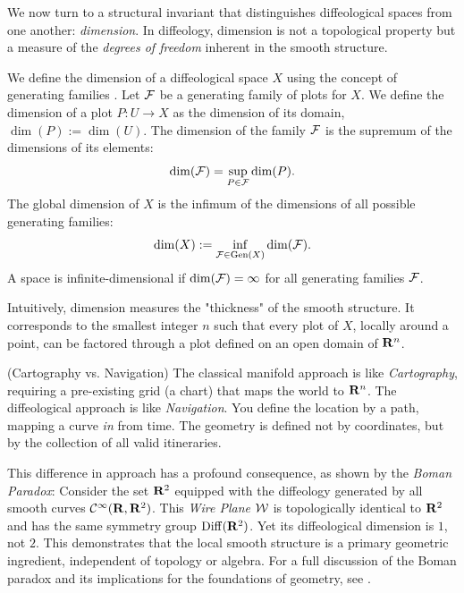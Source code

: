 \documentclass[10pt,reqno,letterpaper,twoside]{amsbook}
\begin{document}
  \begin{article}
    \label{subsec:The Diffeological Dimension}
    
    We now turn to a structural invariant that distinguishes diffeological spaces from one another: \emph{dimension}.
    In diffeology,
    dimension is not a topological property but a measure of the \emph{degrees of freedom} inherent in the smooth structure.
    
    We define the dimension of a diffeological space $X$ using the concept of generating families \cite{PIZ06}.
    Let $\mathcal{F}$ be a generating family of plots for $X$.
    We define the dimension of a plot $P: U \to X$ as the dimension of its domain,
    $\dim(P) := \dim(U)$.
    The dimension of the family $\mathcal{F}$ is the supremum of the dimensions of its elements:
    \[
      \dim(\mathcal{F}) = \sup_{P \in \mathcal{F}} \dim(P).
      \]
    The global dimension of $X$ is the infimum of the dimensions of all possible generating families:
    \[
      \dim(X) := \inf_{\mathcal{F} \in \mathrm{Gen}(X)} \dim(\mathcal{F}).
      \]
    A space is infinite-dimensional if $\dim(\mathcal{F}) = \infty$ for all generating families $\mathcal{F}$.
    
    Intuitively,
    dimension measures the "thickness" of the smooth structure.
    It corresponds to the smallest integer $n$ such that every plot of $X$,
    locally around a point,
    can be factored through a plot defined on an open domain of ${\mathbf{R}}^n$.
    
    \begin{remark} \textup{(Cartography vs. Navigation)}
      \label{subsec:Cartography vs. Navigation}
      The classical manifold approach is like \emph{Cartography},
      requiring a pre-existing grid (a chart) that maps the world to ${\mathbf{R}}^n$.
      The diffeological approach is like \emph{Navigation}.
      You define the location by a path,
      mapping a curve \emph{in} from time.
      The geometry is defined not by coordinates,
      but by the collection of all valid itineraries.
      
      This difference in approach has a profound consequence,
      as shown by the \emph{Boman Paradox}:
      Consider the set ${\mathbf{R}}^2$ equipped with the diffeology generated by all smooth curves ${\mathcal{C}}^\infty({\mathbf{R}}, {\mathbf{R}}^2)$.
      This \emph{Wire Plane} $\mathcal{W}$ is topologically identical to ${\mathbf{R}}^2$ and has the same symmetry group $\operatorname{Diff}({\mathbf{R}}^2)$.
      Yet its diffeological dimension is $1$, not $2$.
      This demonstrates that the local smooth structure is a primary geometric ingredient,
      independent of topology or algebra.
      For a full discussion of the Boman paradox and its implications for the foundations of geometry,
      see \cite{PIZ25c}.
    \end{remark}
  \end{article}
  
\end{document}
